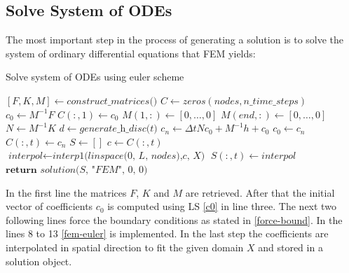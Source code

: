 \subsection{Solve System of ODEs}
The most important step in the process of generating a solution is to solve the system of ordinary differential equations that FEM yields:
\begin{algorithm}[H]
\caption{Solve system of ODEs using euler scheme}
\begin{algorithmic}[1]
\State $[F, K, M] \gets \textit{construct\_matrices()}$
\State $C \gets zeros(nodes, n\_time\_steps)$
\State $c_{0} \gets M^{-1}F$
\State $C(:, 1) \gets c_{0}$
\State $M(1, :) \gets [0, \hdots, 0]$
\State $M(end, :) \gets [0, \hdots, 0]$
\State $N \gets M^{-1}K$
\State $d \gets \textit{generate\_h\_disc(t)}$
\State $c_{n} \gets \Delta t N c_{0} + M^{-1} h + c_{0} $
\State $c_{0} \gets c_{n}$
\State $C(:, t) \gets c_{n}$
\EndFor
\State $S \gets []$
\State $c \gets C(:, t)$
\State $\textit{interpol} \gets \textit{interp1(linspace(0, L, nodes),c, X)}$
\State $S(:, t) \gets \textit{interpol}$
\EndFor
\State $\textbf{return } \textit{solution(S, "FEM", 0, 0)}$
\end{algorithmic}
\end{algorithm}
In the first line the matrices \(F\), \(K\) and \(M\) are retrieved.
After that the initial vector of coefficients \(c_0\) is computed using LS \ref{c0} in line three.
The next two following lines force the boundary conditions as stated in \ref{force-bound}.
In the lines 8 to 13 \ref{fem-euler} is implemented.
In the last step the coefficients are interpolated in spatial direction to fit the given domain \(X\) and stored in a solution object.


	



